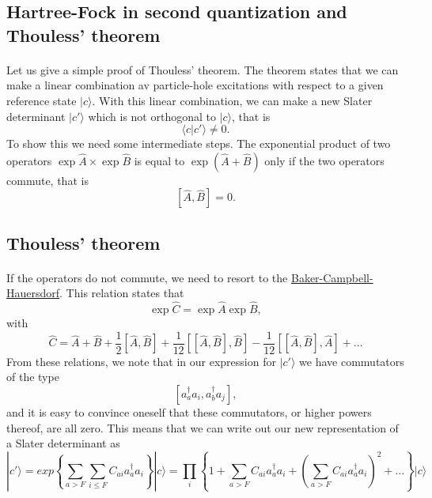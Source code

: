 \documentclass[%
twoside,                 %
final,                   %
10pt]{article}
\begin{document}
\subsection*{Hartree-Fock in second quantization and Thouless' theorem}

\paragraph{}

Let us give a simple proof of Thouless' theorem. The theorem states that we can make a linear combination av particle-hole excitations  with respect to a given reference state $\vert c\rangle$. With this linear combination, we can make a new Slater determinant $\vert c'\rangle $ which is not orthogonal to 
$\vert c\rangle$, that is
\[
\langle c|c'\rangle \ne 0.
\] 
To show this we need some intermediate steps. The exponential product of two operators  $\exp{\hat{A}}\times\exp{\hat{B}}$ is equal to $\exp{(\hat{A}+\hat{B})}$ only if the two operators commute, that is
\[
[\hat{A},\hat{B}] = 0.
\]





\subsection*{Thouless' theorem}

\paragraph{}

If the operators do not commute, we need to resort to the \href{{http://www.encyclopediaofmath.org/index.php/Campbell%
\[
\exp{\hat{C}}=\exp{\hat{A}}\exp{\hat{B}},
\]
with 
\[
\hat{C}=\hat{A}+\hat{B}+\frac{1}{2}[\hat{A},\hat{B}]+\frac{1}{12}[[\hat{A},\hat{B}],\hat{B}]-\frac{1}{12}[[\hat{A},\hat{B}],\hat{A}]+\dots
\]
From these relations, we note that 
in our expression  for $|c'\rangle$ we have commutators of the type
\[
[a_{a}^{\dagger}a_{i},a_{b}^{\dagger}a_{j}],
\]
and it is easy to convince oneself that these commutators, or higher powers thereof, are all zero. This means that we can write out our new representation of a Slater determinant as
\[
|c'\rangle=exp\left\{\sum_{a>F}\sum_{i\le F}C_{ai}a_{a}^{\dagger}a_{i}\right\}| c\rangle=\prod_{i}\left\{1+\sum_{a>F}C_{ai}a_{a}^{\dagger}a_{i}+\left(\sum_{a>F}C_{ai}a_{a}^{\dagger}a_{i}\right)^2+\dots\right\}| c\rangle
\]
\end{document}
